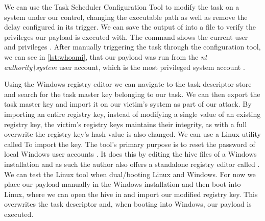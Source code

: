 We can use the Task Scheduler Configuration Tool to modify the  task on a system under our control, changing the executable path as well as remove the delay configured in its trigger.
We can save the output of  into a file to verify the privileges our payload is executed with.
The  command shows the current user and privileges \cite{microsoft-whoami}.
After manually triggering the task through the configuration tool, we can see in \autoref{lst:whoami}, that our payload was run from the \emph{nt authority\textbackslash system} user account, which is the most privileged system account \cite{microsoft-localsystem-account}.

\vspace{1em}



Using the Windows registry editor  we can navigate to the task descriptor store and search for the task master key belonging to our task.
We can then export the task master key and import it on our victim's system as part of our attack.
By importing an entire registry key, instead of modifying a single value of an existing registry key, the victim's registry keys maintains their integrity, as with a full overwrite the registry key's hash value is also changed.
We can use a Linux utility called  To import the key.
The tool's primary purpose is to reset the password of local Windows user accounts \cite{chntpw}.
It does this by editing the hive files of a Windows installation and as such the author also offers a standalone registry editor called .
We can test the Linux tool when dual\-/booting Linux and Windows.
For now we place our payload manually in the Windows installation and then boot into Linux, where we can open the  hive in  and import our modified registry key.
This overwrites the task descriptor and, when booting into Windows, our payload is executed.

